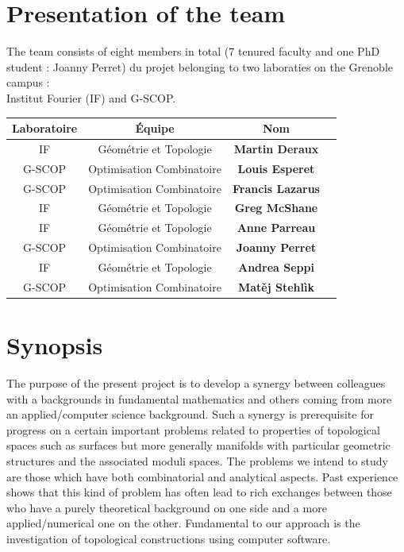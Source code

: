 \documentclass[14pt,fleqn]{article}
\begin{document}
\tableofcontents


\section{Presentation of the team}
The team consists of eight members in total (7 tenured faculty and one PhD student : Joanny Perret) du projet belonging to two  laboraties on the Grenoble campus : \\
Institut Fourier (IF) and G-SCOP.

\smallskip
\vspace{.5cm}
\begin{center}
\begin{tabular}[h]{|c|c|c|l|}
  \hline
 Laboratoire & Équipe & Nom \\
\hline \hline
IF & Géométrie et Topologie & {\bf Martin Deraux} \\
\hline
G-SCOP & Optimisation Combinatoire & {\bf Louis Esperet} \\
\hline
G-SCOP & Optimisation Combinatoire & {\bf Francis Lazarus}\\
\hline
IF & Géométrie et Topologie & {\bf Greg McShane} \\
\hline
IF & Géométrie et Topologie & {\bf Anne Parreau} \\
\hline
G-SCOP & Optimisation Combinatoire & {\bf Joanny Perret} \\
\hline
IF & Géométrie et Topologie & {\bf Andrea Seppi} \\
\hline
G-SCOP & Optimisation Combinatoire & {\bf Mat\v{e}j Stehlìk} \\
\hline
\end{tabular}
\end{center}

\section{Synopsis}


The purpose of the present project is to develop a synergy between colleagues with a backgrounds in fundamental mathematics  and others coming from more an applied/computer science background.
Such a synergy is prerequisite 
for progress on a certain important problems related to properties of topological spaces 
such as surfaces but more generally manifolds with particular geometric structures
and the associated moduli spaces.
The problems we intend to study
are those which have both 
combinatorial and analytical aspects. Past experience shows that
this kind of problem 
has often lead to rich exchanges between 
those  
who have a purely theoretical background 
on one side 
and a more  applied/numerical one
on the other.
Fundamental to our approach is
the investigation
of topological constructions
using computer software.
\end{document}

